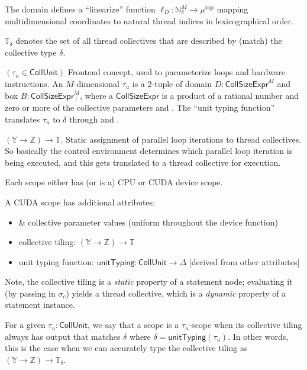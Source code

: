 The domain defines a ``linearize'' function $\ell_D: \mathbb{N}^M_\delta \to \mu^\text{top}$ mapping multidimensional coordinates to natural thread indices in lexicographical order.

$\mathbb{T}_\delta$ denotes the set of all thread collectives that are described by (match) the collective type $\delta$.

\filbreak
{} $(\tau_u \in \mathsf{CollUnit})$
Frontend concept, used to parameterize  loops and hardware instructions.
An $M$-dimensional $\tau_u$ is a 2-tuple of domain $D: \mathsf{CollSizeExpr}^M$ and box $B: \mathsf{CollSizeExpr}^M_\top$, where a $\mathsf{CollSizeExpr}$ is a product of a rational number and zero or more of the collective parameters  and .
The ``unit typing function'' translates $\tau_u$ to $\delta$ through  and .

\filbreak
{} $(\mathbb{Y} \to \mathbb{Z}) \to \mathbb{T}$.
Static assignment of parallel loop iterations to thread collectives.
So basically the control environment determines which parallel loop iteration is being executed, and this gets translated to a thread collective for execution.

\filbreak
{}

Each scope either has (or is a) CPU or CUDA device scope.

\filbreak
A CUDA scope has additional attributes:
\begin{itemize}
  \item {} \&  collective parameter values (uniform throughout the device function)
  \item collective tiling: $(\mathbb{Y} \to \mathbb{Z}) \to \mathbb{T}$
  \item unit typing function: $\mathsf{unitTyping}: \mathsf{CollUnit} \to \Delta$ [derived from other attributes]
\end{itemize}

\filbreak
Note, the collective tiling is a \textit{static} property of a statement node; evaluating it (by passing in $\sigma_c$) yields a thread collective, which is a \textit{dynamic} property of a statement instance.

\filbreak
For a given $\tau_u : \mathsf{CollUnit}$, we say that a scope is a $\tau_u$-scope when its collective tiling always has output that matches $\delta$ where $\delta = \mathsf{unitTyping}(\tau_u)$.
In other words, this is the case when we can accurately type the collective tiling as $(\mathbb{Y} \to \mathbb{Z}) \to \mathbb{T}_\delta$.

